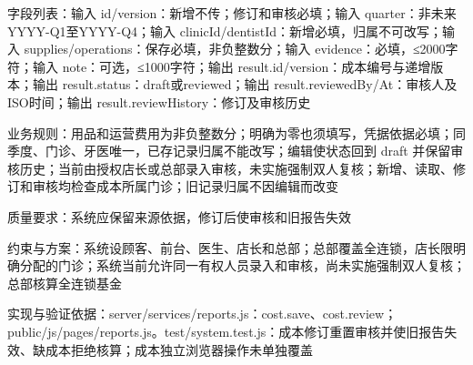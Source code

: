 \documentclass[UTF8,12pt,a4paper,fontset=none]{ctexart}
\begin{document}
字段列表：输入 id/\allowbreak{}version：新增不传；修订和审核必填；输入 quarter：非未来 YYYY-Q1至YYYY-Q4；输入 clinicId/\allowbreak{}dentistId：新增必填，归属不可改写；输入 supplies/\allowbreak{}operations：保存必填，非负整数分；输入 evidence：必填，≤2000字符；输入 note：可选，≤1000字符；输出 result.\allowbreak{}id/\allowbreak{}version：成本编号与递增版本；输出 result.\allowbreak{}status：draft或reviewed；输出 result.\allowbreak{}reviewedBy/\allowbreak{}At：审核人及ISO时间；输出 result.\allowbreak{}reviewHistory：修订及审核历史\par
业务规则：用品和运营费用为非负整数分；明确为零也须填写，凭据依据必填；同季度、门诊、牙医唯一，已存记录归属不能改写；编辑使状态回到 draft 并保留审核历史；当前由授权店长或总部录入审核，未实施强制双人复核；新增、读取、修订和审核均检查成本所属门诊；旧记录归属不因编辑而改变\par
质量要求：系统应保留来源依据，修订后使审核和旧报告失效\par
约束与方案：系统设顾客、前台、医生、店长和总部；总部覆盖全连锁，店长限明确分配的门诊；系统当前允许同一有权人员录入和审核，尚未实施强制双人复核；总部核算全连锁基金\par
实现与验证依据：server/\allowbreak{}services/\allowbreak{}reports.\allowbreak{}js：cost.\allowbreak{}save、cost.\allowbreak{}review；public/\allowbreak{}js/\allowbreak{}pages/\allowbreak{}reports.\allowbreak{}js。test/\allowbreak{}system.\allowbreak{}test.\allowbreak{}js：成本修订重置审核并使旧报告失效、缺成本拒绝核算；成本独立浏览器操作未单独覆盖\par
{}
\end{document}
